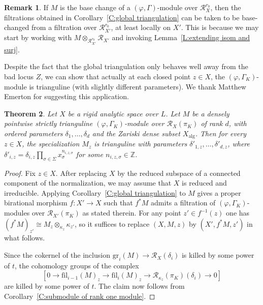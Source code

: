 \documentclass[12pt]{article}
\newtheorem{theorem}{Theorem}[subsection]
\theoremstyle{definition}
\newtheorem{remark}[theorem]{Remark}
\numberwithin{equation}{theorem}
\newcommand{\calR}{\mathcal{R}}
\newcommand{\ZZ}{\mathbb{Z}}
\newcommand{\alg}{\mathrm{alg}}
\newcommand{\fil}{\mathrm{fil}}
\newcommand{\gr}{\mathrm{gr}}
\begin{document}
\begin{remark}
If $M$ is the base change of a $(\varphi, \Gamma)$-module over $\calR_X^{r_0}$, then the filtrations obtained in Corollary~\ref{C:global triangulation} can be taken to be base-changed from a filtration over $\calR_{X'}^{r_0}$, at least locally on $X'$.  This is because we may start by working with $M \otimes_{\calR_{X'}^{r_0}} \calR_{X'}$ and invoking Lemma~\ref{L:extending isom and surj}.
\end{remark}



Despite the fact that the global triangulation only behaves well away from the bad locus $Z$, we can show that actually at each closed point $z \in X$, the $(\varphi, \Gamma_K)$-module is trianguline (with slightly different parameters).  We thank Matthew Emerton for suggesting this application.

\begin{theorem}
\label{T:pointwise triangulation}
Let $X$ be a rigid analytic space over $L$.
Let $M$ be a densely pointwise strictly trianguline $(\varphi,\Gamma_K)$-module over $\calR_X(\pi_K)$ of rank $d$, with ordered parameters $\delta_1, \dots, \delta_d$ and the Zariski dense subset $X_\alg$.  Then for every $z \in X$, the specialization $M_z$ is trianguline with parameters $\delta'_{1, z}, \dots, \delta'_{d,z}$, where $\delta'_{i, z} = \delta_{i,z}\prod_{\sigma \in \Sigma} x_\sigma^{n_{i,z,\sigma}}$ for some $n_{i,z,\sigma} \in \ZZ$.
\end{theorem}
\begin{proof}
Fix $z \in X$.  After replacing $X$ by the reduced subspace of a
connected component of the normalization, we may assume that $X$ is
reduced and irreducible.  Applying Corollary~\ref{C:global
  triangulation} to $M$ gives a proper birational morphism $f: X' \to
X$ such that $f^*M$ admits a filtration of $(\varphi,
\Gamma_K)$-modules over $\calR_{X'}(\pi_K)$ as stated therein.  For
any point $z' \in f^{-1}(z)$ one has $(f^*M)_{z'} \cong M_z
\otimes_{\kappa_z} \kappa_{z'}$, so it suffices to replace $(X,M,z)$
by $(X',f^*M,z')$ in what follows.

Since the cokernel of the inclusion $\gr_i(M) \to \calR_X(\delta_i)$ is killed by some power of $t$, the cohomology groups of the complex
\[
[0 \to \fil_{i-1}(M)_z \to \fil_{i}(M)_z \to \calR_{\kappa_z}(\pi_K)(\delta_i) \to 0]
\]
are killed by some power of $t$.  The claim now follows from Corollary~\ref{C:submodule of rank one module}.
\end{proof}
\end{document}
